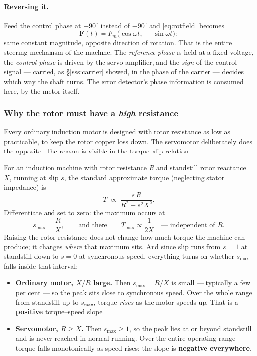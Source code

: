 \documentclass[11pt,a4paper]{article}
\begin{document}
\paragraph{Reversing it.} Feed the control phase at $+90^\circ$ instead of
$-90^\circ$ and \eqref{eq:rotfield} becomes
\[
  \mathbf{F}(t)=F_{m}\big(\cos\omega t,\;-\sin\omega t\big):
\]
same constant magnitude, opposite direction of rotation. That is the entire
steering mechanism of the machine.
The \emph{reference phase} is held at a fixed voltage, the \emph{control
phase} is driven by the servo amplifier, and the \emph{sign} of the control
signal --- carried, as \S\ref{sss:carrier} showed, in the phase of the carrier
--- decides which way the shaft turns. The error detector's phase information
is consumed here, by the motor itself.

\subsubsection{Why the rotor must have a \emph{high} resistance}
\label{sss:highR}

Every ordinary induction motor is designed with rotor resistance as low as
practicable, to keep the rotor copper loss down. The servomotor deliberately
does the opposite. The reason is visible in the torque--slip relation.

For an induction machine with rotor resistance $R$ and standstill rotor
reactance $X$, running at slip $s$, the standard approximate torque (neglecting
stator impedance) is
\begin{equation}
  T\;\propto\;\frac{s\,R}{R^{2}+s^{2}X^{2}} .
  \label{eq:torqueslip}
\end{equation}
Differentiate and set to zero: the maximum occurs at
\begin{equation}
  s_{\max}=\frac{R}{X},
  \qquad\text{and there}\qquad
  T_{\max}\propto\frac{1}{2X}
  \quad\text{--- independent of }R.
  \label{eq:smax}
\end{equation}
Raising the rotor resistance does not change how much torque the machine can
produce; it changes \emph{where} that maximum sits. And since slip runs from
$s=1$ at standstill down to $s=0$ at synchronous speed, everything turns on
whether $s_{\max}$ falls inside that interval:

\begin{itemize}[leftmargin=1.5em,itemsep=3pt]
\item \textbf{Ordinary motor, $X/R$ large.} Then $s_{\max}=R/X$ is small ---
      typically a few per cent --- so the peak sits close to synchronous speed.
      Over the whole range from standstill up to $s_{\max}$, torque
      \emph{rises} as the motor speeds up. That is a \textbf{positive}
      torque--speed slope.
\item \textbf{Servomotor, $R\ge X$.} Then $s_{\max}\ge1$, so the peak lies at
      or beyond standstill and is never reached in normal running. Over the
      entire operating range torque falls monotonically as speed rises: the
      slope is \textbf{negative everywhere}.
\end{itemize}
\end{document}
